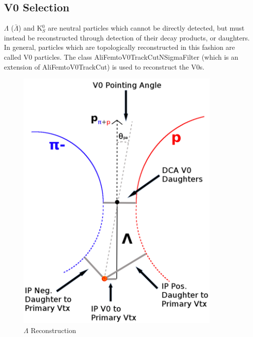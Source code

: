 \subsection{V0 Selection}
\label{V0Selection}

$\Lambda$ ($\bar{\Lambda}$) and K$^{0}_{S}$ are neutral particles which cannot be directly detected, but must instead be reconstructed through detection of their decay products, or daughters.  
In general, particles which are topologically reconstructed in this fashion are called V0 particles.
The class AliFemtoV0TrackCutNSigmaFilter (which is an extension of AliFemtoV0TrackCut) is used to reconstruct the V0s.

\begin{figure}[h]
  \centering
  \includegraphics[width=100mm]{3_DataSelection/Figures/V0Cuts.pdf}
  \caption[$\Lambda$ Reconstruction]{$\Lambda$ Reconstruction}
  \label{fig:LamReconstruction}
\end{figure}

